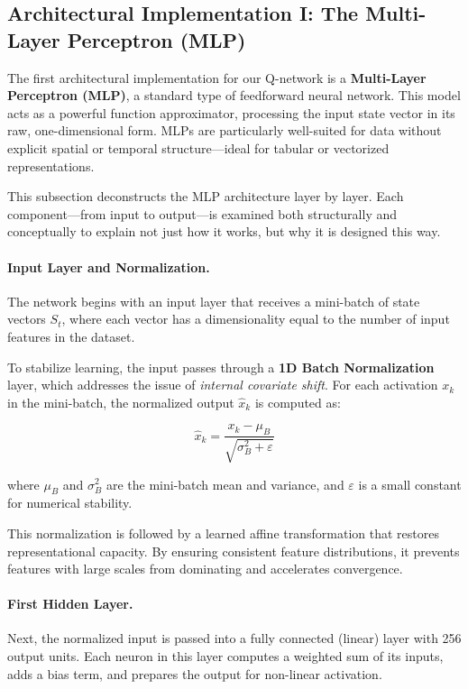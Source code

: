 \documentclass{report}
\begin{document}
\subsection{Architectural Implementation I: The Multi-Layer Perceptron (MLP)}

The first architectural implementation for our Q-network is a \textbf{Multi-Layer Perceptron (MLP)}, a standard type of feedforward neural network. This model acts as a powerful function approximator, processing the input state vector in its raw, one-dimensional form. MLPs are particularly well-suited for data without explicit spatial or temporal structure—ideal for tabular or vectorized representations.

This subsection deconstructs the MLP architecture layer by layer. Each component—from input to output—is examined both structurally and conceptually to explain not just how it works, but why it is designed this way.

\paragraph{Input Layer and Normalization.}
The network begins with an input layer that receives a mini-batch of state vectors \( S_t \), where each vector has a dimensionality equal to the number of input features in the dataset.

To stabilize learning, the input passes through a \textbf{1D Batch Normalization} layer, which addresses the issue of \textit{internal covariate shift}. For each activation \( x_k \) in the mini-batch, the normalized output \( \hat{x}_k \) is computed as:

\[
\hat{x}_k = \frac{x_k - \mu_B}{\sqrt{\sigma_B^2 + \varepsilon}}
\]

where \( \mu_B \) and \( \sigma_B^2 \) are the mini-batch mean and variance, and \( \varepsilon \) is a small constant for numerical stability.

This normalization is followed by a learned affine transformation that restores representational capacity. By ensuring consistent feature distributions, it prevents features with large scales from dominating and accelerates convergence.

\paragraph{First Hidden Layer.}
Next, the normalized input is passed into a fully connected (linear) layer with 256 output units. Each neuron in this layer computes a weighted sum of its inputs, adds a bias term, and prepares the output for non-linear activation.
\end{document}
